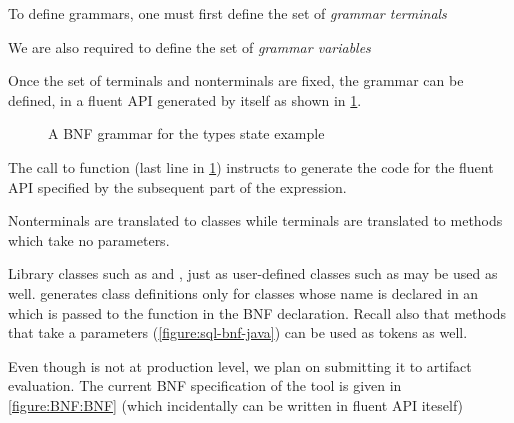 To define grammars, one must first define the set of \emph{grammar
terminals}
\begin{quote}
\end{quote}

We are also required to define the set of \emph{grammar variables}
\begin{quote}
\end{quote}

Once the set of terminals and nonterminals are fixed, the grammar can be
defined, in a fluent API generated by \Fajita itself as shown in
\cref{figure:fluent}.

\begin{figure}
  \caption{A BNF grammar for the types state example}
  \label{figure:fluent}
\end{figure}

The call to function  (last line in \cref{figure:fluent}) instructs
\Fajita to generate the code for the fluent API specified by the
subsequent part of the expression.

Nonterminals are translated to classes while terminals are translated to methods which
take no parameters.  

Library classes such as  and , just as user-defined
classes such as  may be used as well.  \Fajita generates class
definitions only for classes whose name is declared in an  which is
passed to the  function in the BNF declaration.  Recall also that methods that
take a parameters (\cref{figure:sql-bnf-java}) can be used as tokens as well.

Even though \Fajita is not at production level, we plan on submitting it to 
artifact evaluation. The current BNF specification of the tool is given in
\cref{figure:BNF:BNF} (which incidentally can be written in \Fajita fluent 
API iteself)

